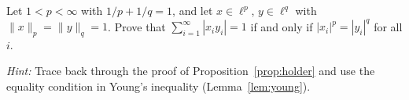 \documentclass[11pt,a4paper]{article}
\begin{document}
\begin{exercise}
\label{ex:holder_equality}
Let $1 < p < \infty$ with $1/p + 1/q = 1$, and let $x \in \ell^p$,
$y \in \ell^q$ with $\|x\|_p = \|y\|_q = 1$. Prove that
$\sum_{i=1}^\infty |x_i y_i| = 1$ if and only if $|x_i|^p = |y_i|^q$ for
all $i$.

\emph{Hint:} Trace back through the proof of Proposition~\ref{prop:holder}
and use the equality condition in Young's inequality
(Lemma~\ref{lem:young}).
\end{exercise}


\end{document}
